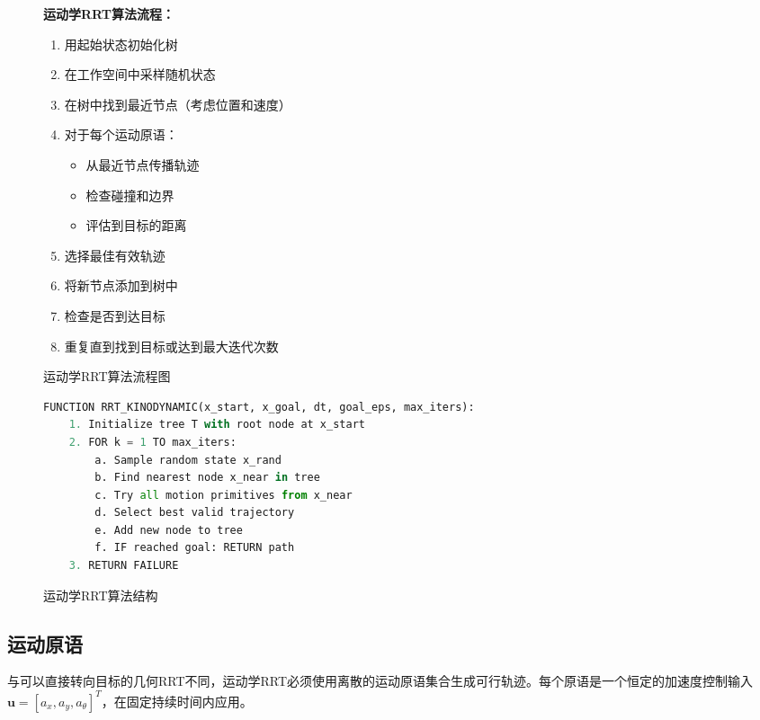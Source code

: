 \documentclass[11pt]{article}
\begin{document}
\begin{CJK}{UTF8}{gbsn}
\begin{figure}[H]
\centering
\begin{minipage}{0.9\textwidth}
\small
\textbf{运动学RRT算法流程：}
\begin{enumerate}
    \item 用起始状态初始化树
    \item 在工作空间中采样随机状态
    \item 在树中找到最近节点（考虑位置和速度）
    \item 对于每个运动原语：
        \begin{itemize}
            \item 从最近节点传播轨迹
            \item 检查碰撞和边界
            \item 评估到目标的距离
        \end{itemize}
    \item 选择最佳有效轨迹
    \item 将新节点添加到树中
    \item 检查是否到达目标
    \item 重复直到找到目标或达到最大迭代次数
\end{enumerate}
\end{minipage}
\caption{运动学RRT算法流程图}
\label{fig:algorithm_flow}
\end{figure}

\begin{figure}[H]
\centering
\begin{lstlisting}[language=Python,mathescape=true]
FUNCTION RRT_KINODYNAMIC(x_start, x_goal, dt, goal_eps, max_iters):
    1. Initialize tree T with root node at x_start
    2. FOR k = 1 TO max_iters:
        a. Sample random state x_rand
        b. Find nearest node x_near in tree
        c. Try all motion primitives from x_near
        d. Select best valid trajectory
        e. Add new node to tree
        f. IF reached goal: RETURN path
    3. RETURN FAILURE
\end{lstlisting}
\caption{运动学RRT算法结构}
\label{alg:kinodynamic_rrt}
\end{figure}

\subsection{运动原语}

与可以直接转向目标的几何RRT不同，运动学RRT必须使用离散的运动原语集合生成可行轨迹。每个原语是一个恒定的加速度控制输入$\mathbf{u} = [a_x, a_y, a_\theta]^T$，在固定持续时间内应用。


\end{CJK}
\end{document}
